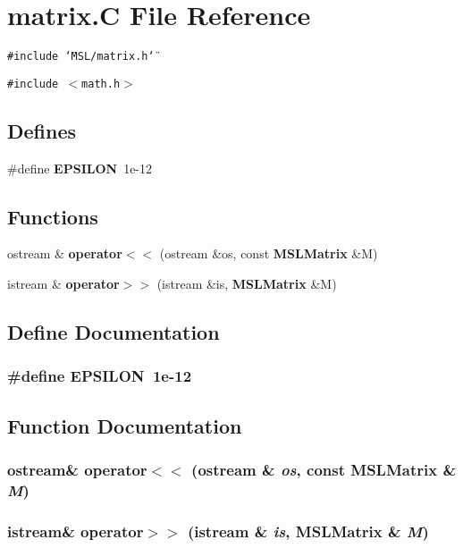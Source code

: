 \section{matrix.C File Reference}
\label{matrix_8C}
{\tt \#include \char`\"{}MSL/matrix.h\char`\"{}}\par
{\tt \#include $<$math.h$>$}\par
\subsection*{Defines}
\begin{CompactItemize}
\item 
\#define {\bf EPSILON}\ 1e-12
\end{CompactItemize}
\subsection*{Functions}
\begin{CompactItemize}
\item 
ostream \& {\bf operator$<$$<$} (ostream \&os, const {\bf MSLMatrix} \&M)
\item 
istream \& {\bf operator$>$$>$} (istream \&is, {\bf MSLMatrix} \&M)
\end{CompactItemize}


\subsection{Define Documentation}
\subsubsection{\setlength{\rightskip}{0pt plus 5cm}\#define EPSILON\ 1e-12}\label{matrix_8C_a0}




\subsection{Function Documentation}
\subsubsection{\setlength{\rightskip}{0pt plus 5cm}ostream\& operator$<$$<$ (ostream \& {\em os}, const {\bf MSLMatrix} \& {\em M})}\label{matrix_8C_a1}


\subsubsection{\setlength{\rightskip}{0pt plus 5cm}istream\& operator$>$$>$ (istream \& {\em is}, {\bf MSLMatrix} \& {\em M})}\label{matrix_8C_a2}



